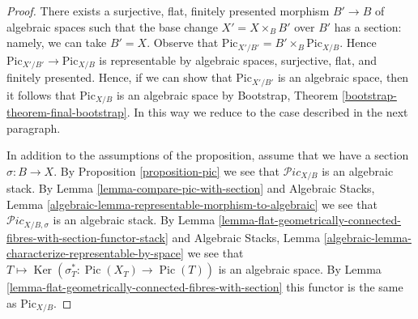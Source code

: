 \documentclass{stacks-project}
\theoremstyle{plain}
\theoremstyle{definition}
\theoremstyle{remark}
\numberwithin{equation}{subsection}
\def\Ker{\mathop{\mathrm{Ker}}}
\def\Pic{\mathop{\mathrm{Pic}}\nolimits}
\def\Picardstack{\mathcal{P}\!\mathit{ic}}
\def\Picardfunctor{\mathrm{Pic}}
\begin{document}
\begin{proof}
There exists a surjective, flat, finitely presented morphism
$B' \to B$ of algebraic spaces such that the base change $X' = X \times_B B'$
over $B'$ has a section: namely, we can take $B' = X$.
Observe that $\Picardfunctor_{X'/B'} = B' \times_B \Picardfunctor_{X/B}$.
Hence $\Picardfunctor_{X'/B'} \to \Picardfunctor_{X/B}$ is representable
by algebraic spaces, surjective, flat, and finitely presented.
Hence, if we can show that $\Picardfunctor_{X'/B'}$ is an algebraic space,
then it follows that $\Picardfunctor_{X/B}$
is an algebraic space by Bootstrap, Theorem
\ref{bootstrap-theorem-final-bootstrap}.
In this way we reduce to the case described in the next paragraph.

\medskip\noindent
In addition to the assumptions of the proposition, assume that
we have a section $\sigma : B \to X$. By
Proposition \ref{proposition-pic} we see that
$\Picardstack_{X/B}$ is an algebraic stack.
By Lemma \ref{lemma-compare-pic-with-section} and
Algebraic Stacks, Lemma
\ref{algebraic-lemma-representable-morphism-to-algebraic}
we see that $\Picardstack_{X/B, \sigma}$ is an algebraic stack.
By Lemma
\ref{lemma-flat-geometrically-connected-fibres-with-section-functor-stack}
and Algebraic Stacks, Lemma
\ref{algebraic-lemma-characterize-representable-by-space}
we see that $T \mapsto \Ker(\sigma_T^* : \Pic(X_T) \to \Pic(T))$
is an algebraic space.
By Lemma \ref{lemma-flat-geometrically-connected-fibres-with-section}
this functor is the same as $\Picardfunctor_{X/B}$.
\end{proof}
\end{document}
